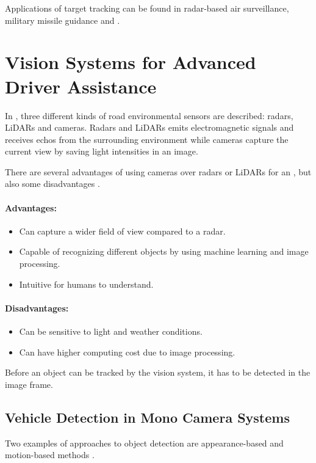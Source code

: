 Applications of target tracking can be found in \eg radar-based air surveillance, military missile guidance and \abbrADAS.

\section{Vision Systems for Advanced Driver Assistance}
In \citep{Sivaraman:2013}, three different kinds of road environmental sensors are described: radars, LiDARs and cameras.
Radars and LiDARs emits electromagnetic signals and receives echos from the surrounding environment while cameras capture the current view by saving light intensities in an image.

There are several advantages of using cameras over radars or LiDARs for an \abbrADAS, but also some disadvantages \cite{Sivaraman:2013}.

\paragraph{Advantages:}
\begin{itemize}
	\item Can capture a wider field of view compared to a radar.
	\item Capable of recognizing different objects by using machine learning and image processing.
	\item Intuitive for humans to understand.
\end{itemize}

\paragraph{Disadvantages:}
\begin{itemize}
	\item Can be sensitive to light and weather conditions.
	\item Can have higher computing cost due to \eg image processing.
\end{itemize}

Before an object can be tracked by the vision system, it has to be detected in the image frame.

\subsection{Vehicle Detection in Mono Camera Systems}
\label{sec:objectdetection}
Two examples of approaches to object detection are appearance-based and motion-based methods \citep{Sivaraman:2013}.

